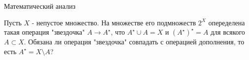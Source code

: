 \documentclass[11pt, a4paper]{../problems_template}
\begin{document}
\begin{titlepage}
  \begin{center}
	\Huge{Математический анализ}
  \end{center}
\end{titlepage}

\begin{exercise}
Пусть $X$ - непустое множество. На множестве его подмножеств $2^{X}$ опеределена такая операция "звездочка" $A \rightarrow A^{\star}$, что $A^{\star} \cup A = X$ и $(A^{\star})^{\star} = A$ для всякого $A \subset X$. Обязана ли операция "звездочка" совпадать с операцией дополнения, то есть $A^{\star} = X \setminus A$?
\end{exercise}
\end{document}
